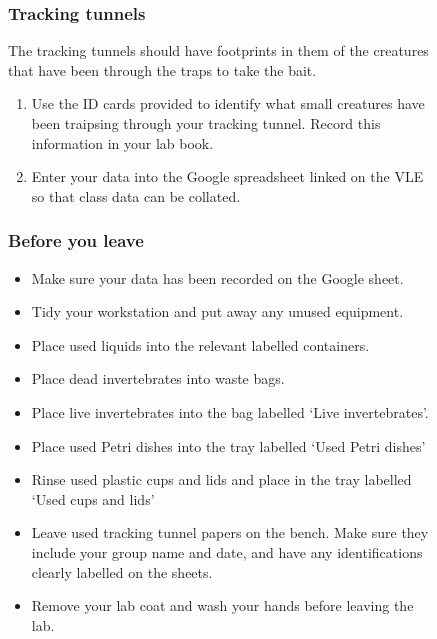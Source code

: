 \documentclass[
  letterpaper,
  DIV=11,
  numbers=noendperiod]{scrreprt}
\providecommand{\tightlist}{%
  \setlength{\itemsep}{0pt}\setlength{\parskip}{0pt}}
\begin{document}
\begin{figure}
{\subsubsection{Tracking tunnels}\label{tracking-tunnels-1}

The tracking tunnels should have footprints in them of the creatures
that have been through the traps to take the bait.

\begin{enumerate}
\def\labelenumi{\arabic{enumi}.}
\item
  Use the ID cards provided to identify what small creatures have been
  traipsing through your tracking tunnel. Record this information in
  your lab book.
\item
  Enter your data into the Google spreadsheet linked on the VLE so that
  class data can be collated.
\end{enumerate}

\subsubsection{Before you leave}\label{before-you-leave-2}

\begin{itemize}
\tightlist
\item
  Make sure your data has been recorded on the Google sheet.
\item
  Tidy your workstation and put away any unused equipment.
\item
  Place used liquids into the relevant labelled containers.
\item
  Place dead invertebrates into waste bags.
\item
  Place live invertebrates into the bag labelled `Live invertebrates'.
\item
  Place used Petri dishes into the tray labelled `Used Petri dishes'
\item
  Rinse used plastic cups and lids and place in the tray labelled `Used
  cups and lids'
\item
  Leave used tracking tunnel papers on the bench. Make sure they include
  your group name and date, and have any identifications clearly
  labelled on the sheets.
\item
  Remove your lab coat and wash your hands before leaving the lab.
\end{itemize}

}

\caption{\label{fig-bci-log-alpha}}

\end{figure}%
\end{document}
